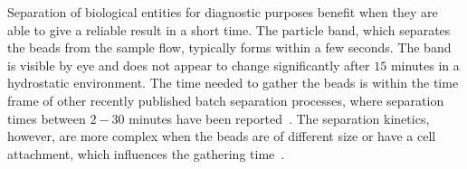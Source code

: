 Separation of biological entities for diagnostic purposes benefit when they are able to give a reliable result in a short time. The particle band, which separates the beads from the sample flow, typically forms within a few seconds. The band is visible by eye and does not appear to change significantly after $15$ minutes in a hydrostatic environment. The time needed to gather the beads is within the time frame of other recently published batch separation processes, where separation times between $2-30$ minutes have been reported~\cite{MiltenyiBiotec2017,Lin2015}. The separation kinetics, however, are more complex when the beads are of different size or have a cell attachment, which influences the gathering time~\cite{Xu2011,Tamer2011,WisePhD2015}.


